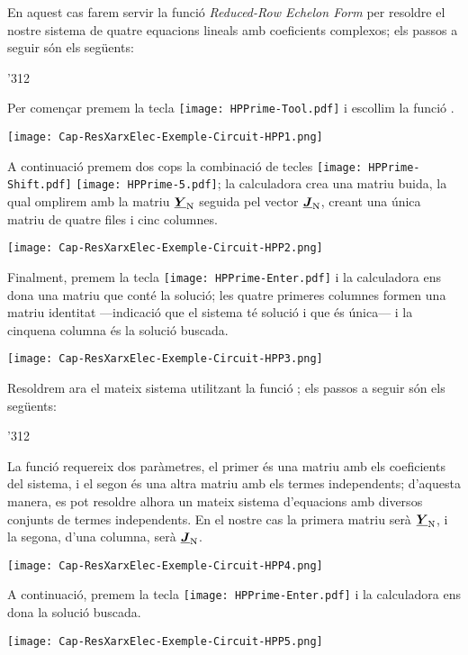 \begin{exemple}
    En aquest cas farem servir la funció  \textit{Reduced-Row Echelon Form} per resoldre el nostre sistema de quatre equacions lineals amb coeficients complexos; els passos a seguir són els següents:

    \begin{dingautolist}{'312}
         \item Per començar premem la tecla \texttt{[image: HPPrime-Tool.pdf]} i escollim la funció .

             \texttt{[image: Cap-ResXarxElec-Exemple-Circuit-HPP1.png]}
         \item A continuació premem dos cops la combinació de tecles  \texttt{[image: HPPrime-Shift.pdf]} \texttt{[image: HPPrime-5.pdf]}; la calculadora crea una matriu buida, la qual omplirem amb la matriu $\underline{\boldsymbol{Y}}_\mathrm{N}$ seguida pel vector $\underline{\boldsymbol{J}}_\mathrm{N}$, creant una única matriu de quatre files i cinc columnes.

             \texttt{[image: Cap-ResXarxElec-Exemple-Circuit-HPP2.png]}

         \item Finalment, premem la tecla \texttt{[image: HPPrime-Enter.pdf]} i la calculadora ens dona una matriu que conté la solució; les quatre primeres columnes formen una matriu identitat ---indicació que el sistema té solució i que és única--- i la cinquena columna és la  solució buscada.

         \texttt{[image: Cap-ResXarxElec-Exemple-Circuit-HPP3.png]}
    \end{dingautolist}

    Resoldrem ara el mateix sistema utilitzant  la funció ; els passos a seguir són els següents:

    \begin{dingautolist}{'312}
         \item La funció  requereix dos paràmetres, el primer és una matriu amb els coeficients del sistema, i el segon és una altra matriu amb els termes independents; d'aquesta manera, es pot resoldre alhora un mateix sistema d'equacions amb diversos conjunts de termes independents. En el nostre cas la primera matriu serà $\underline{\boldsymbol{Y}}_\mathrm{N}$, i la segona, d'una columna, serà  $\underline{\boldsymbol{J}}_\mathrm{N}$.

             \texttt{[image: Cap-ResXarxElec-Exemple-Circuit-HPP4.png]}

         \item A continuació, premem la tecla \texttt{[image: HPPrime-Enter.pdf]} i la calculadora ens dona la  solució buscada.

         \texttt{[image: Cap-ResXarxElec-Exemple-Circuit-HPP5.png]}
    \end{dingautolist}
\end{exemple}



